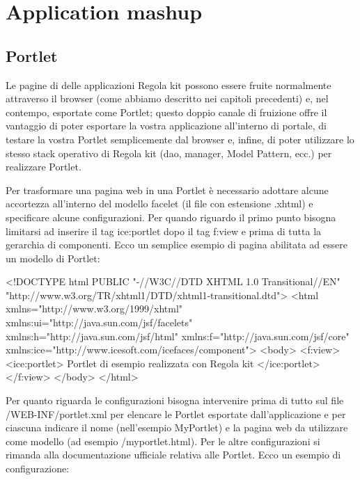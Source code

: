 \chapter{Application mashup}

\section{Portlet}
Le pagine di delle applicazioni Regola kit possono essere fruite normalmente attraverso il browser (come abbiamo descritto nei capitoli precedenti) e, nel contempo, esportate come Portlet; questo doppio canale di fruizione offre il vantaggio di poter esportare la vostra applicazione all'interno di portale, di testare la vostra Portlet semplicemente dal browser e, infine, di poter utilizzare lo stesso stack operativo di Regola kit  (dao, manager, Model Pattern, ecc.) per realizzare Portlet.

Per trasformare una pagina web in una Portlet è necessario adottare alcune accortezza all'interno del  modello facelet (il file con estensione .xhtml) e specificare alcune configurazioni. Per quando riguardo il primo punto bisogna limitarsi ad inserire il tag ice:portlet dopo il tag f:view e prima di tutta la gerarchia di componenti. Ecco un semplice esempio di pagina abilitata ad essere un modello di Portlet:

\begin{xml}
<!DOCTYPE html PUBLIC "-//W3C//DTD XHTML 1.0 Transitional//EN" "http://www.w3.org/TR/xhtml1/DTD/xhtml1-transitional.dtd">
<html xmlns="http://www.w3.org/1999/xhtml"
  xmlns:ui="http://java.sun.com/jsf/facelets"
  xmlns:h="http://java.sun.com/jsf/html"
  xmlns:f="http://java.sun.com/jsf/core"
  xmlns:ice="http://www.icesoft.com/icefaces/component">
<body>
  <f:view>
     <ice:portlet>
        Portlet di esempio realizzata con Regola kit
     </ice:portlet>
  </f:view>
</body>
</html>
\end{xml}

Per quanto riguarda le configurazioni bisogna intervenire prima di tutto sul file /WEB-INF/portlet.xml per elencare le Portlet esportate dall'applicazione e per ciascuna indicare il nome (nell'esempio MyPortlet) e la pagina web da utilizzare come modello (ad esempio /myportlet.html). Per le altre configurazioni si rimanda alla documentazione ufficiale relativa alle Portlet. Ecco un esempio di configurazione:

